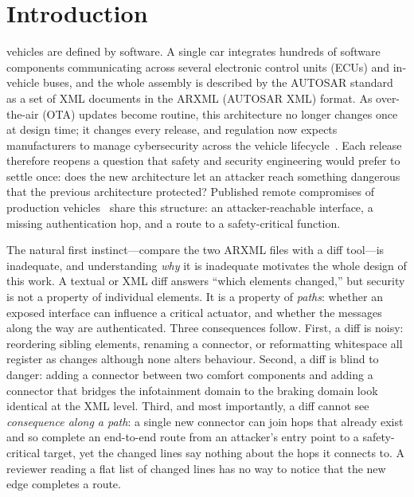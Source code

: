 \documentclass[journal]{IEEEtran}
\begin{document}
\IEEEpeerreviewmaketitle

\section{Introduction}
\label{sec:intro}

 vehicles are defined by software. A single car
integrates hundreds of software components communicating across several
electronic control units (ECUs) and in-vehicle buses, and the whole assembly
is described by the AUTOSAR standard~\cite{autosar} as a set of XML documents
in the ARXML (AUTOSAR XML) format. As over-the-air (OTA) updates become
routine, this architecture no longer changes once at design time; it changes
every release, and regulation now expects manufacturers to manage cybersecurity
across the vehicle lifecycle~\cite{unr155,iso21434}. Each release therefore
reopens a question that safety and security engineering would prefer to settle
once: does the new architecture let an attacker reach something dangerous that
the previous architecture protected? Published remote compromises of
production vehicles~\cite{koscher,checkoway,miller} share this structure: an
attacker-reachable interface, a missing authentication hop, and a route to a
safety-critical function.

The natural first instinct---compare the two ARXML files with a diff tool---is
inadequate, and understanding \emph{why} it is inadequate motivates the whole
design of this work. A textual or XML diff answers ``which elements changed,''
but security is not a property of individual elements. It is a property of
\emph{paths}: whether an exposed interface can influence a critical actuator,
and whether the messages along the way are authenticated. Three consequences
follow. First, a diff is noisy: reordering sibling elements, renaming a
connector, or reformatting whitespace all register as changes although none
alters behaviour. Second, a diff is blind to danger: adding a connector between
two comfort components and adding a connector that bridges the infotainment
domain to the braking domain look identical at the XML level. Third, and most
importantly, a diff cannot see \emph{consequence along a path}: a single new
connector can join hops that already exist and so complete an end-to-end route
from an attacker's entry point to a safety-critical target, yet the changed
lines say nothing about the hops it connects to. A reviewer reading a flat list
of changed lines has no way to notice that the new edge completes a route.
\end{document}
